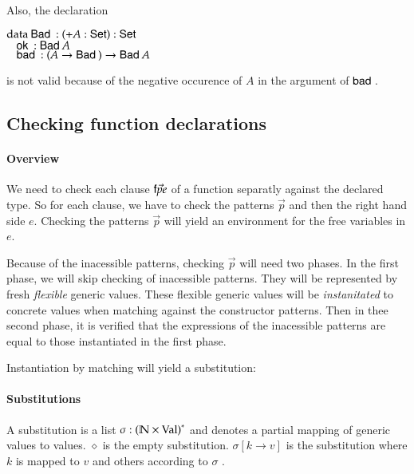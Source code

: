 Also, the declaration 
\begin{bsp}
$\mathrm{data}\: \mathsf{Bad}\: : ( + A : \mathsf{Set} ) : \mathsf{Set} $\\
$\hspace*{3mm} \mathsf{ok}\: : \mathsf{Bad}\: A$\\
$\hspace*{3mm} \mathsf{bad}\: : (A \rightarrow \mathsf{Bad}\:) \rightarrow \mathsf{Bad}\: A$
\end{bsp}
is not valid because of the negative occurence of $A$ in the argument of $\mathsf{bad}\:$.
\subsection{Checking function declarations}

\newcommand\checkcl[2]{#1\:\mathbf{checkcl}\:#2}
\newcommand\checkp[5]{(#1)\vdash#2\:\mathbf{Pat}\:#3\Rightarrow (#4),#5}
\newcommand\checkps[5]{(#1)\vdash#2\:\mathbf{Pats}\:#3\Rightarrow (#4),#5}
\newcommand\checkinacc[4]{(#1)\vdash#2\:\mathbf{checkinacc}\:#3 : #4}
\newcommand\inst[5]{#1,#2\vdash#3\:\mathbf{inst}\:#4\Rightarrow #5}
\newcommand\instlist[5]{#1,#2\vdash#3\:\mathbf{inst_{list}}\:#4\Rightarrow #5}


\paragraph*{Overview}
We need to check each clause $\mathsf{f} \vec{p} e$ of a function separatly against the declared type.
So for each clause, we have to check the patterns $\vec{p}$ and then the right hand side $e$.
Checking the patterns $\vec{p}$ will yield an environment for the free variables in $e$.

Because of the inacessible patterns, checking $\vec{p}$ will need two phases.
In the first phase, we will skip checking of inacessible patterns.
They will be represented by fresh \emph{flexible} generic values.
These flexible generic values will be \emph{instanitated} to concrete values when matching against the constructor patterns.
Then in thee second phase, it is verified that the expressions of the inacessible patterns are equal to those instantiated in the first phase.
\newcommand{\subst}[2]{#1\{#2\}}
\newcommand{\substEnv}[2]{#1\{#2\}}
\newcommand{\compS}[2]{\mathrm{comp}\:#1\:#2}
\newcommand\ptv[2]{#1\Searrow#2}
\newcommand\ptvx{\mathrm{p2v}}
\newcommand\pstvs{\mathrm{p_{s}2v_{s}}}

Instantiation by matching will yield a substitution:

\paragraph*{Substitutions}
A substitution is a list $\sigma : {(\mathbb{N} \times \mathrm{Val})}^{\ast} $ and denotes a partial mapping of generic values to values.
$\diamond$ is the empty substitution.
$\sigma[k \rightarrow v] $ is the substitution where $k$ is mapped to $v$ and others according to $\sigma$ .

